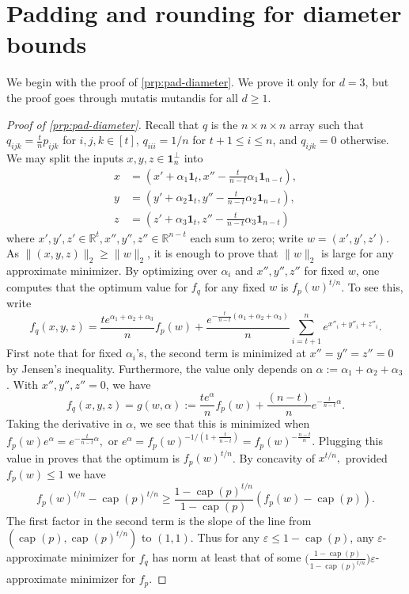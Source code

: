 \documentclass[10pt,a4paper]{article}
\numberwithin{equation}{section}
\DeclareMathOperator{\capa}{cap}
\newcommand{\RR}{\mathbb R}
\newcommand{\eps}{\varepsilon}
\newcommand{\id}{\mathbf{1}}
\begin{document}
%


\appendix\setcounter{section}{4}\section{Padding and rounding for diameter bounds}\label{sec:rounding}

We begin with the proof of \cref{prp:pad-diameter}. We prove it only for $d = 3$, but the proof goes through mutatis mutandis for all $d \geq 1$.

\begin{proof}[Proof of \cref{prp:pad-diameter}]
Recall that $q$ is the $n\times n \times n$ array such that $q_{ijk} = \frac{t}{n} p_{ijk}$ for $i,j,k \in [t]$, $q_{iii} = 1/n$ for $t+1 \leq i \leq n$, and $q_{ijk} = 0$ otherwise. We may split the inputs $x,y,z \in \id_n^\perp$ into 
\begin{align*}x & =\left(x' + \alpha_1 \id_t ,x'' - \frac{t}{n-t} \alpha_1 \id_{n-t}\right),\\
 y&=\left(y' + \alpha_2 \id_t, y'' - \frac{t}{n-t} \alpha_2 \id_{n-t}\right),\\
 z& = \left(z'+ \alpha_3 \id_t ,z''- \frac{t}{n-t} \alpha_3 \id_{n-t}\right)
\end{align*} where $x',y',z' \in \RR^{t}, x'', y'', z'' \in \RR^{n-t}$ each sum to zero; write $w = (x',y',z')$. As $\| (x,y,z)\|_2 \geq \|w\|_2$, it is enough to prove that $\|w\|_2$ is large for any approximate minimizer. By optimizing over $\alpha_i$ and $x'', y'', z''$ for fixed $w$, one computes that the optimum value for $f_q$ for any fixed $w$ is $f_p(w)^{t/n}$. To see this, write
$$ f_q(x,y,z) = \frac{t e^{\alpha_1 + \alpha_2 + \alpha_3}}{n} f_p(w) + \frac{e^{ -\frac{t}{n - t} (\alpha_1 + \alpha_2 + \alpha_3)} }{n} \sum_{i = t+1}^n e^{x''_i + y''_i + z''_i}.$$
First note that for fixed $\alpha_i$'s, the second term is minimized at $x'' = y'' = z'' = 0$ by Jensen's inequality. Furthermore, the value only depends on $\alpha:= \alpha_1 + \alpha_2 + \alpha_3$. With $x'',y'',z'' = 0$, we have
$$ f_q(x,y,z) =g(w, \alpha):= \frac{t e^{\alpha}}{n} f_p(w) + \frac{(n - t) }{n} e^{- \frac{t}{n - t} \alpha}.$$
Taking the derivative in $\alpha$, we see that this is minimized when $ f_p(w) e^{\alpha} = e^{- \frac{t}{n - t} \alpha},$ or $e^{\alpha} = f_p(w)^{-1/(1 + \frac{t}{n-t})} = f_p(w)^{-\frac{n-t}{n}}.$ Plugging this value in proves that the optimum is $f_p(w)^{t/n}$.
By concavity of $x^{t/n},$ provided $f_p(w) \leq 1$ we have 
$$f_p(w)^{t/n} - \capa(p)^{t/n} \geq \frac{1 - \capa(p)^{t/n}}{1 - \capa(p)} (f_p(w) - \capa(p)).$$
The first factor in the second term is the slope of the line from $(\capa(p), \capa(p)^{t/n})$ to $(1,1)$. Thus for any $\eps \leq 1 - \capa(p)$, any $\eps$-approximate minimizer for $f_q$ has norm at least that of some $\big( \frac{1 - \capa(p)}{1 - \capa(p)^{t/n}} \big)\eps$-approximate minimizer for $f_p$.
\end{proof}
\end{document}

